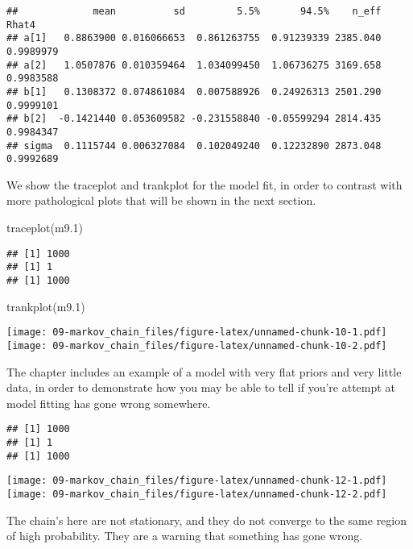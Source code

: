 \documentclass[
]{book}
\newenvironment{Shaded}{\begin{snugshade}}{\end{snugshade}}
\newcommand{\FloatTok}[1]{\textcolor[rgb]{0.00,0.00,0.81}{#1}}
\newcommand{\FunctionTok}[1]{\textcolor[rgb]{0.00,0.00,0.00}{#1}}
\newcommand{\NormalTok}[1]{#1}
\begin{document}
\begin{verbatim}
##             mean          sd         5.5%       94.5%    n_eff     Rhat4
## a[1]   0.8863900 0.016066653  0.861263755  0.91239339 2385.040 0.9989979
## a[2]   1.0507876 0.010359464  1.034099450  1.06736275 3169.658 0.9983588
## b[1]   0.1308372 0.074861084  0.007588926  0.24926313 2501.290 0.9999101
## b[2]  -0.1421440 0.053609582 -0.231558840 -0.05599294 2814.435 0.9984347
## sigma  0.1115744 0.006327084  0.102049240  0.12232890 2873.048 0.9992689
\end{verbatim}

We show the traceplot and trankplot for the model fit, in order to contrast with more pathological plots that will be shown in the next section.

\begin{Shaded}
\begin{Highlighting}[]
\FunctionTok{traceplot}\NormalTok{(m9}\FloatTok{.1}\NormalTok{)}
\end{Highlighting}
\end{Shaded}

\begin{verbatim}
## [1] 1000
## [1] 1
## [1] 1000
\end{verbatim}

\begin{Shaded}
\begin{Highlighting}[]
\FunctionTok{trankplot}\NormalTok{(m9}\FloatTok{.1}\NormalTok{)}
\end{Highlighting}
\end{Shaded}

\texttt{[image: 09-markov\_chain\_files/figure-latex/unnamed-chunk-10-1.pdf]} \texttt{[image: 09-markov\_chain\_files/figure-latex/unnamed-chunk-10-2.pdf]}

The chapter includes an example of a model with very flat priors and very little data, in order to demonstrate how you may be able to tell if you're attempt at model fitting has gone wrong somewhere.

\begin{verbatim}
## [1] 1000
## [1] 1
## [1] 1000
\end{verbatim}

\texttt{[image: 09-markov\_chain\_files/figure-latex/unnamed-chunk-12-1.pdf]} \texttt{[image: 09-markov\_chain\_files/figure-latex/unnamed-chunk-12-2.pdf]}

The chain's here are not stationary, and they do not converge to the same region of high probability. They are a warning that something has gone wrong.
\end{document}
